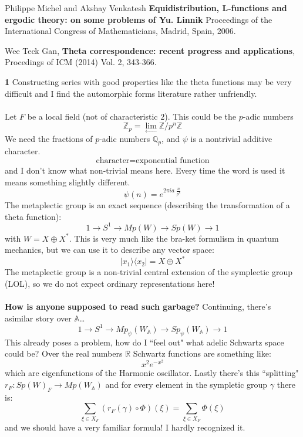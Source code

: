 \documentclass[12pt]{article}
\begin{document}
\selectfont \fontsize{12}{10}\selectfont

\begin{thebibliography}{}

\item Philippe Michel and Akshay Venkatesh \textbf{Equidistribution, L-functions and ergodic theory: on some problems of Yu. Linnik} Proceedings of the International Congress
of Mathematicians, Madrid, Spain, 2006.

\item  Wee Teck Gan, \textbf{Theta correspondence: recent progress and applications}, Procedings of
ICM (2014) Vol. 2, 343-366.

\end{thebibliography}


\newpage

\noindent \textbf{1} \quad Constructing series with good properties like the theta functions may be very difficult and I find the automorphic forms literature rather unfriendly.  \\ \\
Let $F$ be a local field (not of characteristic $2$).  This could be the $p$-adic numbers 
$$ \mathbb{Z}_p = \lim_{\longleftarrow} \mathbb{Z}/p^n\mathbb{Z} $$
We need the fractions of $p$-adic numbers $\mathbb{Q}_p$, and $\psi$ is a nontrivial additive character.  
$$ \text{character} = \text{exponential function}$$
and I don't know what non-trivial means here.  Every time the word is used it means something slightly different. 
$$ \psi(n) = e^{2\pi i a\; \frac{n}{p^k}} $$
The metaplectic group is an exact sequence (describing the transformation of a theta function):
$$ 1 \to S^1 \to Mp(W) \to Sp(W) \to 1 $$
with $W = X \oplus X^\ast$. This is very much like the bra-ket formulism in quantum mechanics, but we can use it to describe any vector space:
$$ |x_1 \rangle \langle x_2 | = X \oplus X^\ast$$
The metaplectic group is a non-trivial central extension of the symplectic group (LOL), so we do not expect ordinary representations here! \\ \\
\textbf{How is anyone supposed to read such garbage?} Continuing, there's asimilar story over $\mathbb{A}$\dots
$$
1 \to S^1 \to Mp_\psi (W_\mathbb{A}) 
\to Sp_\psi (W_\mathbb{A}) \to 1
 $$
This already poses a problem, how do I ``feel out" what adelic Schwartz space could be?  Over the real numbers 
$\mathbb{R}$ Schwartz functions are something like:
$$ x^2 e^{-x^2} $$
which are eigenfunctions of the Harmonic oscillator. Lastly there's this ``splitting" $r_F : Sp(W)_F \to Mp(W_\mathbb{A})$ and for every element in the sympletic group $\gamma$ there is:
$$ \sum_{\xi \in X_F} (r_F(\gamma) \circ \Phi) (\xi) = \sum_{\xi \in X_F} \Phi(\xi) $$ 
and we should have a very familiar formula!  I hardly recognized it.
\end{document}
